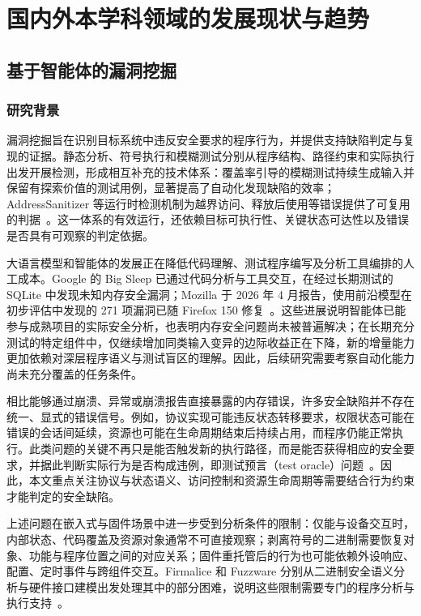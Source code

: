 \section{国内外本学科领域的发展现状与趋势}

\subsection{基于智能体的漏洞挖掘}

\subsubsection{研究背景}

漏洞挖掘旨在识别目标系统中违反安全要求的程序行为，并提供支持缺陷判定与复现的证据。静态分析、符号执行和模糊测试分别从程序结构、路径约束和实际执行出发开展检测，形成相互补充的技术体系：覆盖率引导的模糊测试持续生成输入并保留有探索价值的测试用例，显著提高了自动化发现缺陷的效率；AddressSanitizer 等运行时检测机制为越界访问、释放后使用等错误提供了可复用的判据~\cite{fuzzingsurvey,asan}。这一体系的有效运行，还依赖目标可执行性、关键状态可达性以及错误是否具有可观察的判定依据。

大语言模型和智能体的发展正在降低代码理解、测试程序编写及分析工具编排的人工成本。Google 的 Big Sleep 已通过代码分析与工具交互，在经过长期测试的 SQLite 中发现未知内存安全漏洞；Mozilla 于 2026 年 4 月报告，使用前沿模型在初步评估中发现的 271 项漏洞已随 Firefox 150 修复~\cite{bigsleep,mozillafirefox150}。这些进展说明智能体已能参与成熟项目的实际安全分析，也表明内存安全问题尚未被普遍解决；在长期充分测试的特定组件中，仅继续增加同类输入变异的边际收益正在下降，新的增量能力更加依赖对深层程序语义与测试盲区的理解。因此，后续研究需要考察自动化能力尚未充分覆盖的任务条件。

相比能够通过崩溃、异常或崩溃报告直接暴露的内存错误，许多安全缺陷并不存在统一、显式的错误信号。例如，协议实现可能违反状态转移要求，权限状态可能在错误的会话间延续，资源也可能在生命周期结束后持续占用，而程序仍能正常执行。此类问题的关键不再只是能否触发新的执行路径，而是能否获得相应的安全要求，并据此判断实际行为是否构成违例，即测试预言（test oracle）问题~\cite{oracleproblem}。因此，本文重点关注协议与状态语义、访问控制和资源生命周期等需要结合行为约束才能判定的安全缺陷。

上述问题在嵌入式与固件场景中进一步受到分析条件的限制：仅能与设备交互时，内部状态、代码覆盖及资源对象通常不可直接观察；剥离符号的二进制需要恢复对象、功能与程序位置之间的对应关系；固件重托管后的行为也可能依赖外设响应、配置、定时事件与跨组件交互。Firmalice 和 Fuzzware 分别从二进制安全语义分析与硬件接口建模出发处理其中的部分困难，说明这些限制需要专门的程序分析与执行支持~\cite{firmalice,fuzzware}。

